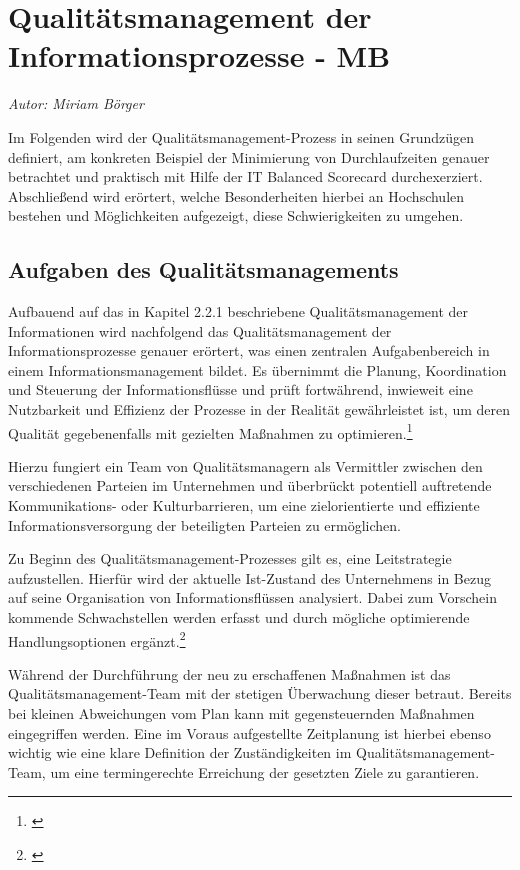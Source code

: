 \section{Qualitätsmanagement der Informationsprozesse - MB}
\textit{Autor: Miriam Börger}


Im Folgenden wird der Qualitätsmanagement-Prozess in seinen Grundzügen definiert, am konkreten Beispiel der Minimierung von Durchlaufzeiten genauer betrachtet und praktisch mit Hilfe der IT Balanced Scorecard durchexerziert. 
Abschließend wird erörtert, welche Besonderheiten hierbei an Hochschulen bestehen und Möglichkeiten aufgezeigt, diese Schwierigkeiten zu umgehen.

\subsection{Aufgaben des Qualitätsmanagements}
Aufbauend auf das in Kapitel 2.2.1 beschriebene Qualitätsmanagement der Informationen wird nachfolgend das Qualitätsmanagement der Informationsprozesse genauer erörtert, was einen zentralen Aufgabenbereich in einem Informationsmanagement bildet. Es übernimmt die Planung, Koordination und Steuerung der Informationsflüsse und prüft fortwährend, inwieweit eine Nutzbarkeit und Effizienz der Prozesse in der Realität gewährleistet ist, um deren Qualität gegebenenfalls mit gezielten Maßnahmen zu optimieren.\footnote{\cite{schroder_wertorientiertes_2005}}

Hierzu fungiert ein Team von Qualitätsmanagern als Vermittler zwischen den verschiedenen Parteien im Unternehmen und überbrückt potentiell auftretende Kommunikations- oder Kulturbarrieren, um eine zielorientierte und effiziente Informationsversorgung der beteiligten Parteien zu ermöglichen. 

Zu Beginn des Qualitätsmanagement-Prozesses gilt es, eine Leitstrategie aufzustellen. Hierfür wird der aktuelle Ist-Zustand des Unternehmens in Bezug auf seine Organisation von Informationsflüssen analysiert. Dabei zum Vorschein kommende Schwachstellen werden erfasst und durch mögliche optimierende Handlungsoptionen ergänzt.\footnote{\cite{helmke_management_2013}}

Während der Durchführung der neu zu erschaffenen Maßnahmen ist das Qualitätsmanagement-Team mit der stetigen Überwachung dieser betraut. Bereits bei kleinen Abweichungen vom Plan kann mit gegensteuernden Maßnahmen eingegriffen werden. Eine im Voraus aufgestellte Zeitplanung ist hierbei ebenso wichtig wie eine klare Definition der Zuständigkeiten im Qualitätsmanagement-Team, um eine termingerechte Erreichung der gesetzten Ziele zu garantieren.

